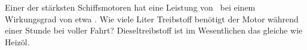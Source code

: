 Einer der stärksten Schiffsmotoren hat eine Leistung von \PmO\ bei einem Wirkungsgrad von etwa \etMO. Wie viele Liter Treibstoff benötigt der Motor während einer Stunde bei voller Fahrt? Dieseltreibstoff ist im Wesentlichen das gleiche wie Heizöl.
